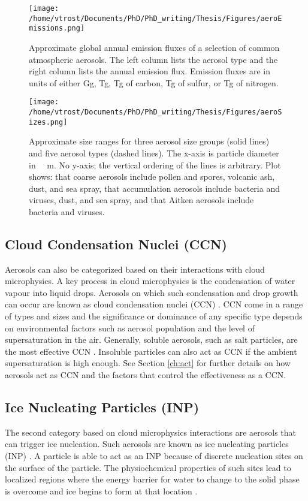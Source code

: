 \begin{figure}[H]
	\centering
	\texttt{[image: /home/vtrost/Documents/PhD/PhD\_writing/Thesis/Figures/aeroEmissions.png]}
	\caption{Approximate global annual emission fluxes of a selection of common atmospheric aerosols. The left column lists the aerosol type and the right column lists the annual emission flux. Emission fluxes are in units of either Gg, Tg, Tg of carbon, Tg of sulfur, or Tg of nitrogen. \citep[][Table 2.1]{bouc2015}}
	\label{fig:aeroEmissions}
\end{figure}

\begin{figure}[H]
	\centering
	\texttt{[image: /home/vtrost/Documents/PhD/PhD\_writing/Thesis/Figures/aeroSizes.png]}
	\caption{Approximate size ranges for three aerosol size groups (solid lines) and five aerosol types (dashed lines). The x-axis is particle diameter in \SI{}{\mu m}. No y-axis; the vertical ordering of the lines is arbitrary. Plot shows: that coarse aerosols include pollen and spores, volcanic ash, dust, and sea spray, that accumulation aerosols include bacteria and viruses, dust, and sea spray, and that Aitken aerosols include bacteria and viruses. \citep[Estimates based on][]{bouc2015}}
	\label{fig:aeroSizes}
\end{figure}

\subsection{Cloud Condensation Nuclei (CCN)}
Aerosols can also be categorized based on their interactions with cloud microphysics. A key process in cloud microphysics is the condensation of water vapour into liquid drops. Aerosols on which such condensation and drop growth can occur are known as cloud condensation nuclei (CCN) \citep{rog1989,bouc2015}. CCN come in a range of types and sizes and the significance or dominance of any specific type depends on environmental factors such as aerosol population and the level of supersaturation in the air. Generally, soluble aerosols, such as salt particles, are the most effective CCN \citep{rog1989,lamb2011}. Insoluble particles can also act as CCN if the ambient supersaturation is high enough. See Section \ref{ch:act} for further details on how aerosols act as CCN and the factors that control the effectiveness as a CCN.

\subsection{Ice Nucleating Particles (INP)}
The second category based on cloud microphysics interactions are aerosols that can trigger ice nucleation. Such aerosols are known as ice nucleating particles (INP) \citep{vali2015}. A particle is able to act as an INP because of discrete nucleation sites on the surface of the particle. The physiochemical properties of such sites lead to localized regions where the energy barrier for water to change to the solid phase is overcome and ice begins to form at that location \citep{con2009,bouc2015}.

